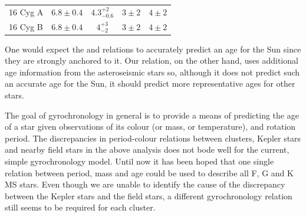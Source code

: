 \documentclass[useAMS, usenatbib]{mn2e}
\begin{document}
\begin{table}
\begin{tabular}{lcccc}
16 Cyg A    & $6.8 \pm 0.4$     & $4.3^{+2}_{-0.6}$       & $3\pm2$
	    & $4\pm2$ \\

16 Cyg B    & $6.8 \pm 0.4$     & $4^{+3}_{-2}$       & $3\pm2$
	    & $4\pm2$ \\
\hline
\end{tabular}
\end{table}

One would expect the \citet{Barnes2007} and \citet{Mamajek2008} relations to
accurately predict an age for the Sun since they are strongly anchored to it.
Our relation, on the other hand, uses additional age information from the
asteroseismic stars so, although it does not predict such an accurate age for
the Sun, it should predict more representative ages for other stars.

The goal of gyrochronology in general is to provide a means of predicting the
age of a star given observations of its colour (or mass, or temperature), and
rotation period.
The discrepancies in period-colour relations between clusters, Kepler stars
and nearby field stars in the above analysis does not bode well for the
current, simple gyrochronology model.
Until now it has been hoped that one single relation between period, mass and
age could be used to describe all F, G and K MS stars.
Even though we are unable to identify the cause of the discrepancy between the
Kepler stars and the field stars, a different gyrochronology relation still
seems to be required for each cluster.
\end{document}

